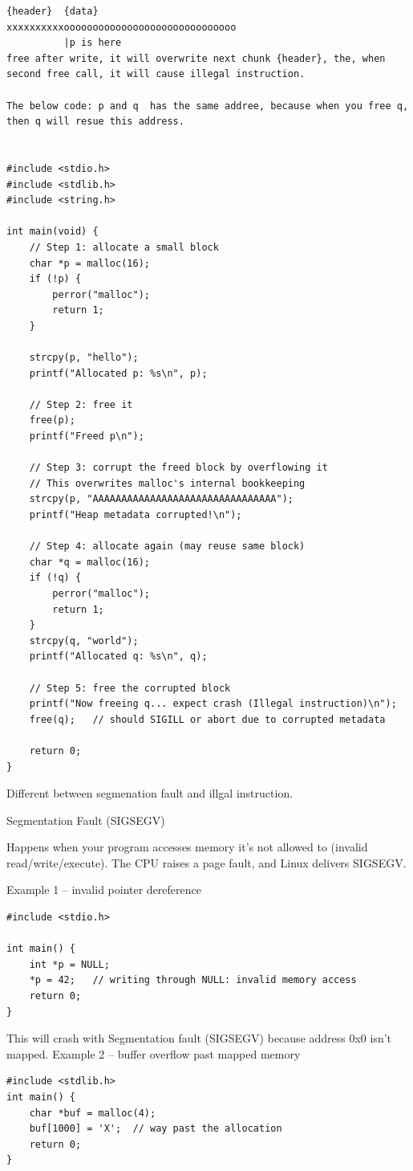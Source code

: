 \documentclass[paper=8.5in:11in, twoside, 12pt, pagesize=pdftex]{book}
\begin{document}
\begin{lstlisting}
{header}  {data}
xxxxxxxxxxoooooooooooooooooooooooooooooo
          |p is here
free after write, it will overwrite next chunk {header}, the, when second free call, it will cause illegal instruction. 

The below code: p and q  has the same addree, because when you free q, then q will resue this address.             
    

#include <stdio.h>
#include <stdlib.h>
#include <string.h>

int main(void) {
    // Step 1: allocate a small block
    char *p = malloc(16);
    if (!p) {
        perror("malloc");
        return 1;
    }

    strcpy(p, "hello");
    printf("Allocated p: %s\n", p);

    // Step 2: free it
    free(p);
    printf("Freed p\n");

    // Step 3: corrupt the freed block by overflowing it
    // This overwrites malloc's internal bookkeeping
    strcpy(p, "AAAAAAAAAAAAAAAAAAAAAAAAAAAAAAAA");
    printf("Heap metadata corrupted!\n");

    // Step 4: allocate again (may reuse same block)
    char *q = malloc(16);
    if (!q) {
        perror("malloc");
        return 1;
    }
    strcpy(q, "world");
    printf("Allocated q: %s\n", q);

    // Step 5: free the corrupted block
    printf("Now freeing q... expect crash (Illegal instruction)\n");
    free(q);   // should SIGILL or abort due to corrupted metadata

    return 0;
}

\end{lstlisting}

Different between segmenation fault and illgal instruction.

Segmentation Fault (SIGSEGV)

Happens when your program accesses memory it’s not allowed to (invalid read/write/execute).
The CPU raises a page fault, and Linux delivers SIGSEGV.

Example 1 – invalid pointer dereference
\begin{lstlisting}
#include <stdio.h>

int main() {
    int *p = NULL;
    *p = 42;   // writing through NULL: invalid memory access
    return 0;
}
\end{lstlisting}


 This will crash with Segmentation fault (SIGSEGV) because address 0x0 isn’t mapped.
Example 2 – buffer overflow past mapped memory
\begin{lstlisting}
#include <stdlib.h>
int main() {
    char *buf = malloc(4);
    buf[1000] = 'X';  // way past the allocation
    return 0;
}
\end{lstlisting}
\end{document}

